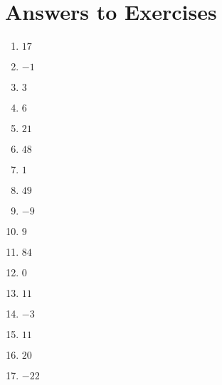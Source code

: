 \documentclass[11pt]{article}
\begin{document}
\section{Answers to Exercises}
\begin{enumerate}
	\item $17$
	\item $-1$
	\item $3$
	\item $6$
	\item $21$
	\item $48$
	\item $1$
	\item $49$
	\item $-9$
	\item $9$
	\item $84$
	\item $0$
	\item $11$
	\item $-3$
	\item $11$
	\item $20$
	\item $-22$
\end{enumerate}
\end{document}
